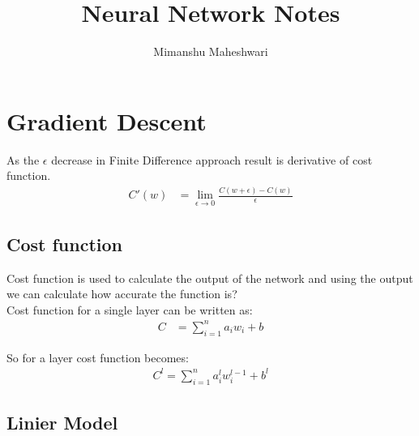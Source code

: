 \documentclass{article}
\begin{document}
\title{Neural Network Notes}
\author{Mimanshu Maheshwari}


\section{Gradient Descent}
As the $\epsilon$ decrease in Finite Difference approach result is derivative of cost function.
\begin{align}
	C'(w) &= \lim_{\epsilon \to 0}\frac{C(w + \epsilon) - C(w)}{\epsilon}
\end{align}

\subsection{Cost function}
Cost function is used to calculate the output of the network and using the output we can calculate how accurate the function is? \\
Cost function for a single layer can be written as:
\begin{align}
	C &= \sum_{i = 1}^{n}{a_iw_i + b}
\end{align}

So for a layer cost function becomes: 
\begin{align}
	C^{l} = \sum_{i = 1}^{n}{a_{i}^{l}w_{i}^{l - 1} + b^{l}}
\end{align}


\subsection{Linier Model}
\end{document}
